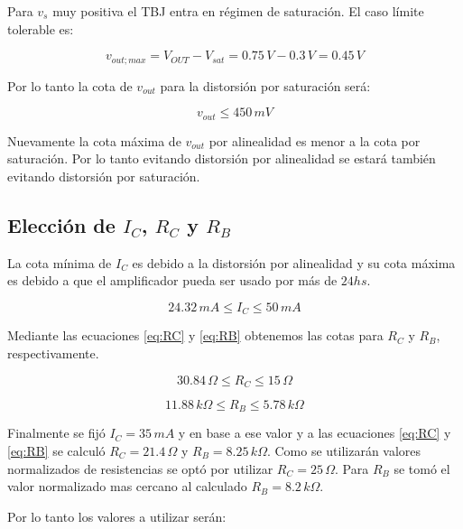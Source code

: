 \documentclass[10pt,spanish,a4paper,openany,notitlepage]{article}
\begin{document}
Para $v_s$ muy positiva el TBJ entra en régimen de saturación. El caso
límite tolerable es:

\[ \displaystyle v_{out;max} = V_{OUT} - V_{sat} = 0.75\, \unit{V} - 0.3\, \unit{V} = 0.45\, \unit{V} \]

Por lo tanto la cota de $v_{out}$ para la distorsión por saturación será:

\begin{equation}
v_{out} \leqslant 450\, \unit{mV}
\label{eq:vout_corte}
\end{equation}

Nuevamente la cota máxima de $v_{out}$ por alinealidad es menor a la cota por saturación.
Por lo tanto evitando distorsión por alinealidad se estará también evitando
distorsión por saturación.

\subsection{Elección de $I_C$, $R_C$ y $R_B$}

La cota mínima de $I_C$ es debido a la distorsión por alinealidad y
su cota máxima es debido a que el amplificador pueda ser usado por más
de $24 \unit{hs}$.

\begin{equation}
24.32\, \unit{mA}\leqslant I_C \leqslant 50\, \unit{mA}
\label{eq:IC_cotas}
\end{equation}

Mediante las ecuaciones \ref{eq:RC} y \ref{eq:RB} obtenemos las cotas para $R_C$
y $R_B$, respectivamente.

\begin{equation}
30.84\, \unit{\Omega}\leqslant R_C \leqslant 15\, \unit{\Omega}
\label{eq:RC_cotas}
\end{equation}

\begin{equation}
11.88\, \unit{k\Omega}\leqslant R_B \leqslant 5.78\, \unit{k\Omega}
\label{eq:RB_cotas}
\end{equation}

Finalmente se fijó $I_C = 35\, \unit{mA}$ y en base a ese valor
y a las ecuaciones \ref{eq:RC} y \ref{eq:RB} se calculó $R_C = 21.4\, \unit{\Omega}$ y $R_B = 8.25\, \unit{k\Omega}$.
Como se utilizarán valores normalizados de resistencias se optó por
utilizar $R_C = 25\, \unit{\Omega}$. Para $R_B$ se tomó el valor
normalizado mas cercano al calculado $R_B = 8.2\, \unit{k\Omega}$.

Por lo tanto los valores a utilizar serán:
\end{document}
